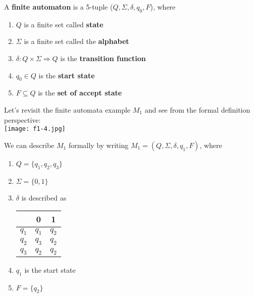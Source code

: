 \begin{definition}
    A \textbf{finite automaton} is a 5-tuple (\(Q, \Sigma, \delta, q_0, F\)), where
    \begin{enumerate}
        \item \(Q\) is a finite set called \textbf{state} 
        \item \(\Sigma\) is a finite set called the \textbf{alphabet} 
        \item \(\delta: Q \times \Sigma \Rightarrow Q\) is the \textbf{transition function}
        \item \(q_0 \in Q\) is the \textbf{start state}
        \item \(F \subseteq Q\) is the \textbf{set of accept state}         
    \end{enumerate}
\end{definition}

\begin{eg}
    Let's revisit the finite automata example \(M_1\) and see from the formal definition perspective: \\
    \texttt{[image: f1-4.jpg]}

    We can describe \(M_1\) formally by writing \(M_1 = (Q, \Sigma, \delta, q_1, F)\), where   
    \begin{enumerate}
        \item \(Q = \{q_1, q_2, q_3\}\)
        \item \(\Sigma = \{ 0, 1 \} \)  
        \item \(\delta\) is described as 
        \begin{table}[H]
            \centering
            \begin{tabular}{c|c|c}
                \toprule
                     & 0 & 1  \\
                \midrule
                   \(q_1\)  & \(q_1\)  & \(q_2\)  \\
                   \(q_2\)  & \(q_3\)  & \(q_2\)  \\
                   \(q_3\)  & \(q_2\)  & \(q_2\)  \\
                \bottomrule
            \end{tabular}
        \end{table}
        \item \(q_1\) is the start state
        \item \(F = \{ q_2 \} \)  
    \end{enumerate}
\end{eg}

